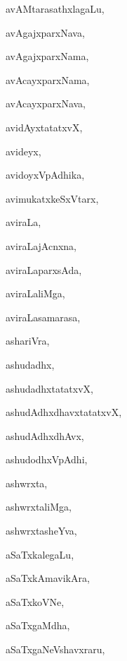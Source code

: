 \begin{multicols}{3}
{\noindent
{avAMtarasathxlagaLu}, \pageref{avAMtarasathxlagaLu}

\noindent
{avAgajxparxNava}, \pageref{avAgajxparxNava}

\noindent
{avAgajxparxNama}, \pageref{avAgajxparxNama}

\noindent
{avAcayxparxNama}, \pageref{avAcayxparxNama}

\noindent
{avAcayxparxNava}, \pageref{avAcayxparxNava}

\noindent
{avidAyxtatatxvX}, \pageref{avidAyxtatatxvX}

\noindent
{avideyx}, \pageref{avideyx}

\noindent
{avidoyxVpAdhika}, \pageref{avidoyxVpAdhika}

\noindent
{avimukatxkeSxVtarx}, \pageref{avimukatxkeSxVtarx}

\noindent
{aviraLa}, \pageref{aviraLa}

\noindent
{aviraLajAcnxna}, \pageref{aviraLajAcnxna}

\noindent
{aviraLaparxsAda}, \pageref{aviraLaparxsAda}

\noindent
{aviraLaliMga}, \pageref{aviraLaliMga}

\noindent
{aviraLasamarasa}, \pageref{aviraLasamarasa}

\noindent
{ashariVra}, \pageref{ashariVra}

\noindent
{ashudadhx}, \pageref{ashudadhx}

\noindent
{ashudadhxtatatxvX}, \pageref{ashudadhxtatatxvX}

\noindent
{ashudAdhxdhavxtatatxvX}, \pageref{ashudAdhxdhavxtatatxvX}

\noindent
{ashudAdhxdhAvx}, \pageref{ashudAdhxdhAvx}

\noindent
{ashudodhxVpAdhi}, \pageref{ashudodhxVpAdhi}

\noindent
{ashwrxta}, \pageref{ashwrxta}

\noindent
{ashwrxtaliMga}, \pageref{ashwrxtaliMga}

\noindent
{ashwrxtasheYva}, \pageref{ashwrxtasheYva}

\noindent
{aSaTxkalegaLu}, \pageref{aSaTxkalegaLu}

\noindent
{aSaTxkAmavikAra}, \pageref{aSaTxkAmavikAra}

\noindent
{aSaTxkoVNe}, \pageref{aSaTxkoVNe}

\noindent
{aSaTxgaMdha}, \pageref{aSaTxgaMdha}

\noindent
{aSaTxgaNeVshavxraru}, \pageref{aSaTxgaNeVshavxraru}

}
\end{multicols}
